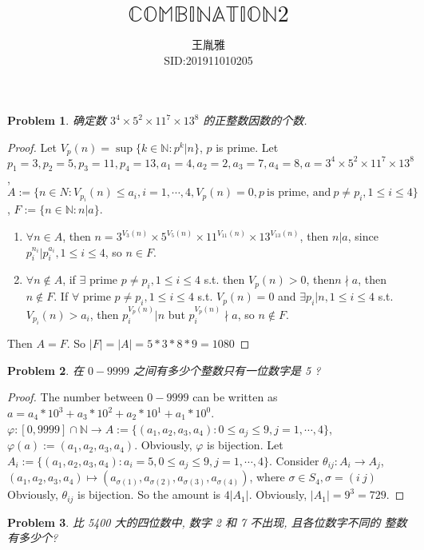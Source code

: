 \documentclass{ctexart}
\title{$\mathbb{COMBINATION}\text{2}$}
\author{王胤雅\\
SID:201911010205\\
\email{201911010205@mail.bnu.edu.cn}}
\newtheorem{problem}{\textbf{Problem}}
\newcommand\N{\mathbb {N}}
\renewcommand\phi{\varphi}
\renewcommand{\(}{\left(}
\renewcommand{\)}{\right)}
\begin{document}
\maketitle

\begin{problem}
    确定数 $3^4 \times 5^2 \times 11^7 \times 13^8$ 的正整数因数的个数.
\end{problem}
\begin{proof}
    Let $V_p(n)=\sup\{k\in\N: p^k|n\}$, $p$ is prime. 
    Let $p_1=3,p_2=5,p_3=11,p_4=13, a_1=4,a_2=2,a_3=7,a_4=8, a=3^4 \times 5^2 \times 11^7 \times 13^8$, $A:=\{n\in N: V_{p_i}(n)\leq a_i, i=1,\cdots ,4, V_p(n)=0, p \ \text{is prime, and}\  p\neq p_i, 1\leq i\leq 4 \}$, $F:=\{n\in \N : n|a\}$. 
    \iffalse$\psi : A\to F$, $n\mapsto 3^{V_3(n)} \times 5^{V_5(n)} \times 11^{V_{11}(n)}\times 13^{V_{13}(n)}$. \fi
    \begin{enumerate}
        \item $\forall n\in A$, then $n= 3^{V_3(n)} \times 5^{V_5(n)} \times 11^{V_{11}(n)}\times 13^{V_{13}(n)}$,  then $n|a$, since $p_i^{n_i}|p_i^{a_i}, 1\leq i\leq 4$, so $n\in F$.
        \item $\forall n\notin A$, if $\exists $ prime $p\neq p_i,1\leq i\leq 4$ s.t. then $V_p(n) > 0$, then$n\nmid a$, then $n\notin F$. If $\forall $ prime $p\neq p_i,1\leq i\leq 4$ s.t. $V_p(n)=0$ and $\exists p_i | n, 1\leq i\leq 4 $ s.t. $V_{p_i}(n)>a_i$, then $p_i^{V_p(n)}|n$ but $p_i^{V_p(n)}\nmid a$, so $n\notin F$.
    \end{enumerate}
    Then $A=F$. So $|F|=|A|=5*3*8*9=1080$
\end{proof}
\begin{problem}
    在 $0-9999$ 之间有多少个整数只有一位数字是 5 ?
\end{problem}
\begin{proof}
    The number between $0-9999$ can be written as $a = a_4*10^3+a_3*10^2+a_2*10^1+a_1*10^0$. $\phi: [0,9999]\cap \N\to A:=\{(a_1,a_2,a_3,a_4):0\leq a_j\leq 9, j=1,\cdots, 4\}$,  $\phi(a):=(a_1,a_2,a_3,a_4)$. Obviously, $\phi$ is bijection. Let $A_i:=\{(a_1,a_2,a_3,a_4):a_i=5,0\leq a_j\leq 9, j=1,\cdots, 4\}$. Consider $\theta_{ij}: A_i\to A_j$, $(a_1,a_2,a_3,a_4)\mapsto(a_{\sigma(1)},a_{\sigma(2)},a_{\sigma(3)},a_{\sigma(4)})$, where $\sigma\in S_4, \sigma=(i\ j)$
    Obviously, $\theta_{ij}$ is bijection. So the amount is $4|A_1|$. Obviously, $|A_1|=9^3=729$.
\end{proof}
\begin{problem}
    比 5400 大的四位数中, 数字 2 和 7 不出现, 且各位数字不同的 整数有多少个?
\end{problem}
\end{document}
